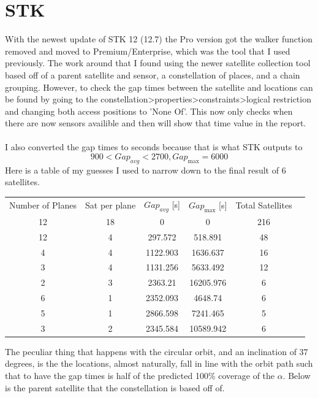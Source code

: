 \documentclass[a4paper, twoside]{article}
\begin{document}
\section{STK}
With the newest update of STK 12 (12.7) the Pro version got the walker function removed and moved to Premium/Enterprise, which was the tool that I used previously.
The work around that I found using the newer satellite collection tool based off of a parent satellite and sensor, 
a constellation of places, and a chain grouping. However, to check the gap times between the satellite and locations can be found
by going to the constellation>properties>constraints>logical restriction and changing both access positions to 'None Of'. This now only
checks when there are now sensors availible and then will show that time value in the report.
\\
\\
I also converted the gap times to seconds because that is what STK outputs to
\[900<Gap_{avg}<2700,Gap_{\max} = 6000\]
Here is a table of my guesses I used to narrow down to the final result of 6 satellites.
\begin{center}   
\begin{tabular}{cccccc}
  Number of Planes & Sat per plane & \(Gap_{avg}\) [s] & \(Gap_{\max}\) [s] & Total Satellites\\
  12 & 18 & 0 & 0 & 216\\
  12 & 4 & 297.572 & 518.891 & 48\\
  4 & 4 & 1122.903 & 1636.637 & 16\\
  3 & 4 & 1131.256 & 5633.492 & 12\\
  2 & 3 & 2363.21 & 16205.976 & 6\\
  6 & 1 & 2352.093 & 4648.74 & 6 \\
  5 & 1 & 2866.598 & 7241.465 & 5 \\
  3 & 2 & 2345.584 & 10589.942 & 6
\end{tabular}
\end{center}
The peculiar thing that happens with the circular orbit, and an inclination of 37 degrees, is the the locations, almost naturally, fall in
line with the orbit path such that to have the gap times is half of the predicted 100\% coverage of the 
\(\alpha\). Below is the parent satellite that the constellation is based off of.
\end{document}
